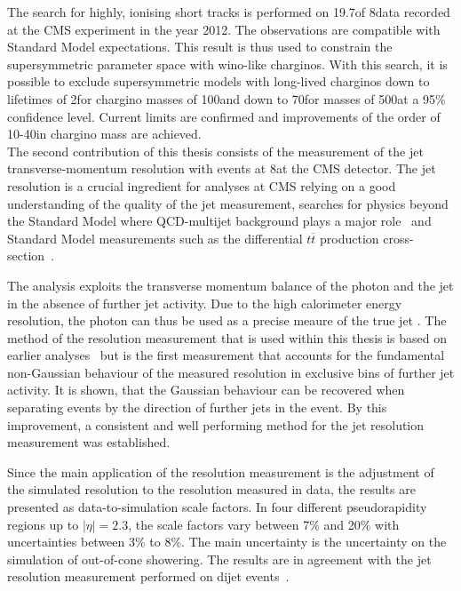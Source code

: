 The search for highly, ionising short tracks is performed on 19.7\fbinv of 8\tev data recorded at the CMS experiment in the year 2012.
The observations are compatible with Standard Model expectations.
This result is thus used to constrain the supersymmetric parameter space with wino-like charginos.
With this search, it is possible to exclude supersymmetric models with long-lived charginos down to lifetimes of 2\cm for chargino masses of 100\gev and down to 70\cm for masses of 500\gev at a 95\% confidence level.
Current limits are confirmed and improvements of the order of 10-40\gev in chargino mass are achieved.\\


The second contribution of this thesis consists of the measurement of the jet transverse-momentum resolution with \GAMJET events at 8\tev at the CMS detector.
The jet \pt resolution is a crucial ingredient for analyses at CMS relying on a good understanding of the quality of the jet \pt measurement, \eg searches for physics beyond the Standard Model where QCD-multijet background plays a major role~\cite{bib:CMS:RA2_8TeV,bib:CMS:MT2_8TeV,bib:CMS:AlphaT_8TeV} and Standard Model measurements such as the differential $t\overline{t}$ production cross-section~\cite{bib:CMS:TopCrossSection_8TeV}.

The analysis exploits the transverse momentum balance of the photon and the jet in the absence of further jet activity.
Due to the high calorimeter energy resolution, the photon \pt can thus be used as a precise meaure of the true jet \pt.
The method of the resolution measurement that is used within this thesis is based on earlier analyses~\cite{FIXME} but is the first measurement that accounts for the fundamental non-Gaussian behaviour of the measured resolution in exclusive bins of further jet activity.
It is shown, that the Gaussian behaviour can be recovered when separating events by the direction of further jets in the event.
By this improvement, a consistent and well performing method for the jet \pt resolution measurement was established.

Since the main application of the resolution measurement is the adjustment of the simulated resolution to the resolution measured in data, the results are presented as data-to-simulation scale factors.
In four different pseudorapidity regions up to $|\eta|=2.3$, the scale factors vary between 7\% and 20\% with uncertainties between 3\% to 8\%.
The main uncertainty is the uncertainty on the simulation of out-of-cone showering.
The results are in agreement with the jet \pt resolution measurement performed on dijet events~\cite{bib:Kristin_Thesis}.\\

